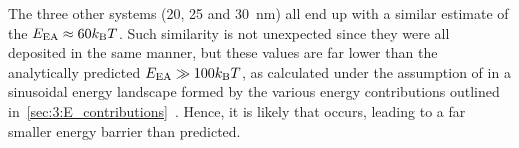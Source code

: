 The three other systems (20, 25 and \SI{30}{\nano\metre}) all end up with a similar estimate of the  $\EEA \approx 60 \kBT$.
Such similarity is not unexpected since they were all deposited in the same manner, but these values are far lower than the analytically predicted $\EEA \gg 100 \kBT$, as calculated under the assumption of  in a sinusoidal energy landscape formed by the various energy contributions outlined in~\cref{sec:3:E_contributions}~\cite[Supp. 4]{KUR-24}.
Hence, it is likely that  occurs, leading to a far smaller energy barrier than predicted. \\\par %

